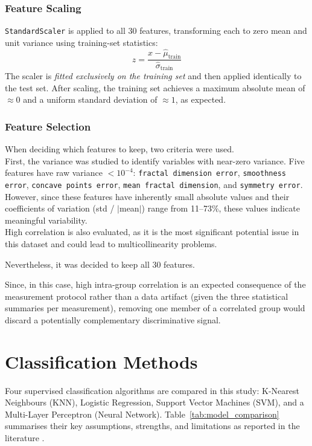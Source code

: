 \documentclass[twocolumn, fontsize=10pt]{article}
\begin{document}
\subsubsection{Feature Scaling}

\texttt{StandardScaler} is applied to all 30 features, transforming each to zero mean and unit variance using training-set statistics:
\[
    z = \frac{x - \hat{\mu}_{\text{train}}}{\hat{\sigma}_{\text{train}}}
\]
The scaler is \textit{fitted exclusively on the training set} and then applied identically to the test set. After scaling, the training set achieves a maximum absolute mean of $\approx 0$ and a uniform standard deviation of $\approx 1$, as expected.\\


\subsubsection{Feature Selection}
When deciding which features to keep, two criteria were used.\\
First, the variance was studied to identify variables with near-zero variance. Five features have raw variance $< 10^{-4}$: \texttt{fractal dimension error}, \texttt{smoothness error}, \texttt{concave points error}, \texttt{mean fractal dimension}, and \texttt{symmetry error}. However, since these features have inherently small absolute values and their coefficients of variation (std / $|$mean$|$) range from 11--73\%, these values indicate meaningful variability. \\

High correlation is also evaluated, as it is the most significant potential issue in this dataset and could lead to multicollinearity problems.


Nevertheless, it was decided to keep all 30 features.

Since, in this case, high intra-group correlation is an expected consequence of the measurement protocol rather than a data artifact (given the three statistical summaries per measurement), removing one member of a correlated group would discard a potentially complementary discriminative signal.


\section{Classification Methods}
\label{sec:methods_class}

Four supervised classification algorithms are compared in this study: K-Nearest Neighbours (KNN), Logistic Regression, Support Vector Machines (SVM), and a Multi-Layer Perceptron (Neural Network). Table~\ref{tab:model_comparison} summarises their key assumptions, strengths, and limitations as reported in the literature \citep{uddin2019comparing, hastie2009elements, bishop2006pattern, james2021statistical}.
\end{document}
